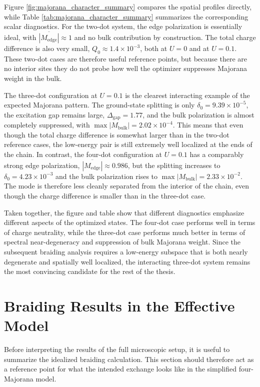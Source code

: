 Figure \ref{fig:majorana_character_summary} compares the spatial profiles directly, while Table \ref{tab:majorana_character_summary} summarizes the corresponding scalar diagnostics. For the two-dot system, the edge polarization is essentially ideal, with $\overline{|M_{\mathrm{edge}}|} \approx 1$ and no bulk contribution by construction. The total charge difference is also very small, $Q_0 \approx 1.4 \times 10^{-3}$, both at $U=0$ and at $U=0.1$. These two-dot cases are therefore useful reference points, but because there are no interior sites they do not probe how well the optimizer suppresses Majorana weight in the bulk.

The three-dot configuration at $U=0.1$ is the clearest interacting example of the expected Majorana pattern. The ground-state splitting is only $\delta_0 = 9.39 \times 10^{-5}$, the excitation gap remains large, $\Delta_{\mathrm{gap}} = 1.77$, and the bulk polarization is almost completely suppressed, with $\max |M_{\mathrm{bulk}}| = 2.02 \times 10^{-4}$. This means that even though the total charge difference is somewhat larger than in the two-dot reference cases, the low-energy pair is still extremely well localized at the ends of the chain. In contrast, the four-dot configuration at $U=0.1$ has a comparably strong edge polarization, $\overline{|M_{\mathrm{edge}}|} \approx 0.986$, but the splitting increases to $\delta_0 = 4.23 \times 10^{-3}$ and the bulk polarization rises to $\max |M_{\mathrm{bulk}}| = 2.33 \times 10^{-2}$. The mode is therefore less cleanly separated from the interior of the chain, even though the charge difference is smaller than in the three-dot case.

Taken together, the figure and table show that different diagnostics emphasize different aspects of the optimized states. The four-dot case performs well in terms of charge neutrality, while the three-dot case performs much better in terms of spectral near-degeneracy and suppression of bulk Majorana weight. Since the subsequent braiding analysis requires a low-energy subspace that is both nearly degenerate and spatially well localized, the interacting three-dot system remains the most convincing candidate for the rest of the thesis.

\section{Braiding Results in the Effective Model}
Before interpreting the results of the full microscopic setup, it is useful to summarize the idealized braiding calculation. This section should therefore act as a reference point for what the intended exchange looks like in the simplified four-Majorana model.


